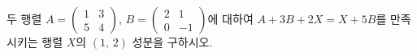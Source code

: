 \hspace*{2mm}\begin{minipage}[t]{\dimexpr\linewidth-2mm\relax}\vspace{0pt}
두 행렬 $A=\begin{pmatrix} 1 & 3 \\ 5 & 4 \end{pmatrix}$, $B=\begin{pmatrix} 2 & 1 \\ 0 & -1 \end{pmatrix}$에 대하여 $A+3B+2X=X+5B$를 만족시키는 행렬 $X$의 $(1,\,2)$ 성분을 구하시오.\end{minipage}
